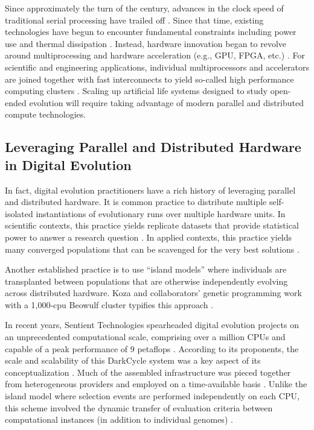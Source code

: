 Since approximately the turn of the century, advances in the clock speed of traditional serial processing have trailed off \citep{sutter2005free}.
Since that time, existing technologies have begun to encounter fundamental constraints including power use and thermal dissipation \citep{markov2014limits}.
Instead, hardware innovation began to revolve around multiprocessing  \citep[p.55]{hennessy2011computer} and hardware acceleration (e.g., GPU, FPGA, etc.) \citep{che2008accelerating}.
For scientific and engineering applications, individual multiprocessors and accelerators are joined together with fast interconnects to yield so-called high performance computing clusters \citep[p.436]{hennessy2011computer}.
Scaling up artificial life systems designed to study open-ended evolution will require taking advantage of modern parallel and distributed compute technologies.

\subsection{Leveraging Parallel and Distributed Hardware in Digital Evolution}

In fact, digital evolution practitioners have a rich history of leveraging parallel and distributed hardware.
It is common practice to distribute multiple self-isolated instantiations of evolutionary runs over multiple hardware units.
In scientific contexts, this practice yields replicate datasets that provide statistical power to answer a research question \citep{dolson2017spatial}.
In applied contexts, this practice yields many converged populations that can be scavenged for the very best solutions \citep{hornby2006automated}.

Another established practice is to use ``island models'' where individuals are transplanted between populations that are otherwise independently evolving across distributed hardware.
Koza and collaborators' genetic programming work with a 1,000-cpu Beowulf cluster typifies this approach \citep{bennett1999building}.

In recent years, Sentient Technologies spearheaded digital evolution projects on an unprecedented computational scale, comprising over a million CPUs and capable of a peak performance of 9 petaflops \citep{miikkulainen2019evolving}.
According to its proponents, the scale and scalability of this DarkCycle system was a key aspect of its conceptualization \citep{gilbert_2015}.
Much of the assembled infrastructure was pieced together from heterogeneous providers and employed on a time-available basis \citep{blondeau2012distributed}.
Unlike the island model where selection events are performed independently on each CPU, this scheme involved the dynamic transfer of evaluation criteria between computational instances (in addition to individual genomes) \citep{hodjat2013distributed}.

